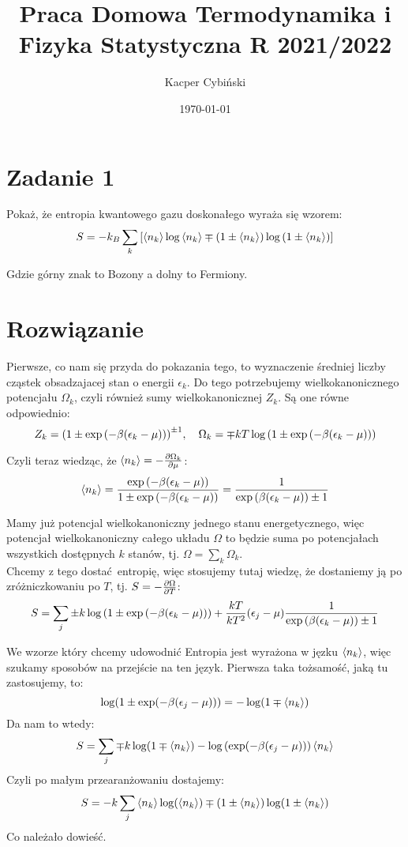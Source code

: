 \documentclass[12pt,a4paper]{article}
\title{Praca Domowa Termodynamika i Fizyka Statystyczna R 2021/2022}
\author{Kacper Cybiński}
\date{\today}
\begin{document}
\maketitle

\section{Zadanie 1}

Pokaż, że entropia kwantowego gazu doskonałego wyraża się wzorem:
\[
    S = - k_B \sum_k \qty[\ev{n_k} \log \ev{n_k} \mp \qty(1 \pm \ev{n_k}) \log\qty(1 \pm \ev{n_k})]    
\]

Gdzie górny znak to Bozony a dolny to Fermiony.

\section{Rozwiązanie}

Pierwsze, co nam się przyda do pokazania tego, to wyznaczenie średniej liczby cząstek obsadzajacej stan o energii $\epsilon_k$. Do tego potrzebujemy wielkokanonicznego potencjału $\Omega_k$, czyli również sumy wielkokanonicznej $Z_k$. Są one równe odpowiednio:
\[
    Z_k = \qty(1 \pm \exp\qty(- \beta \qty(\epsilon_k - \mu)))^{\pm 1} \qc \Omega_k = \mp kT \log\qty(1 \pm \exp\qty(-\beta(\epsilon_k - \mu)))    
\]

Czyli teraz wiedząc, że $\ev{n_k} = - \pdv{\Omega_k}{\mu}$:
\[
   \ev{n_k} = \frac{\exp\qty(- \beta \qty(\epsilon_k - \mu))}{1 \pm \exp\qty(- \beta \qty(\epsilon_k - \mu))} = \frac{1}{\exp\qty(\beta \qty(\epsilon_k - \mu)) \pm 1}
\]

Mamy już potencjal wielkokanoniczny jednego stanu energetycznego, więc potencjał wielkokanoniczny całego układu $\Omega$ to będzie suma po potencjałach wszystkich dostępnych $k$ stanów, tj. $\Omega = \sum_k \Omega_k$.\\
Chcemy z tego dostać entropię, więc stosujemy tutaj wiedzę, że dostaniemy ją po zróżniczkowaniu po $T$, tj. $S = - \pdv{\Omega}{T}$:
\[
    S = \sum_j \pm k \log\qty(1 \pm \exp\qty(- \beta \qty(\epsilon_k - \mu))) + \frac{k T}{k T^2} (\epsilon_j - \mu) \frac{1}{\exp\qty(\beta \qty(\epsilon_k - \mu)) \pm 1}  
\]

We wzorze który chcemy udowodnić Entropia jest wyrażona w jęzku $\ev{n_k}$, więc szukamy sposobów na przejście na ten język. Pierwsza taka tożsamość, jaką tu zastosujemy, to:
\[
    \log(1 \pm \exp(-\beta (\epsilon_j - \mu))) = - \log(1 \mp \ev{n_k})    
\]
Da nam to wtedy:
\[
    S = \sum_j \mp k \log(1 \mp \ev{n_k}) - \log\qty(\exp(- \beta (\epsilon_j - \mu))) \ev{n_k}    
\]
Czyli po małym przearanżowaniu dostajemy:
\[
    S = -k \sum_j \ev{n_k}\log(\ev{n_k}) \mp (1 \pm \ev{n_k}) \log(1 \pm \ev{n_k})    
\]
Co należało dowieść.
\end{document}
